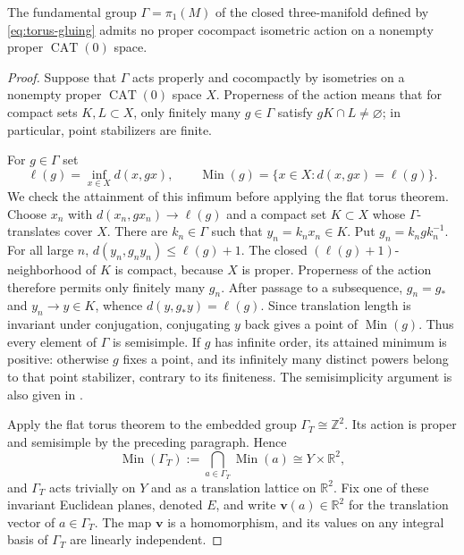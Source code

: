 \begin{theorem}\label{thm:no-cat0-action}
The fundamental group $\Gamma=\pi_1(M)$ of the closed three-manifold
defined by \eqref{eq:torus-gluing} admits no proper cocompact isometric
action on a nonempty proper $\operatorname{CAT}(0)$ space.
\end{theorem}

\begin{proof}
Suppose that $\Gamma$ acts properly and cocompactly by isometries on a
nonempty proper $\operatorname{CAT}(0)$ space $X$.  Properness of the action
means that for compact sets $K,L\subset X$, only finitely many
$g\in\Gamma$ satisfy $gK\cap L\ne\varnothing$; in particular, point
stabilizers are finite.

For $g\in\Gamma$ set
\[
 \ell(g)=\inf_{x\in X}d(x,gx),\qquad
 \operatorname{Min}(g)=\{x\in X:d(x,gx)=\ell(g)\}.
\]
We check the attainment of this infimum before applying the flat torus
theorem.  Choose $x_n$ with $d(x_n,gx_n)\to\ell(g)$ and a compact set
$K\subset X$ whose $\Gamma$-translates cover $X$.  There are $k_n\in\Gamma$
such that $y_n=k_nx_n\in K$.  Put $g_n=k_ngk_n^{-1}$.
For all large $n$, $d(y_n,g_ny_n)\le\ell(g)+1$.  The closed
$(\ell(g)+1)$-neighborhood of $K$ is compact, because $X$ is proper.
Properness of the action therefore permits only finitely many $g_n$.
After passage to a subsequence, $g_n=g_*$ and $y_n\to y\in K$, whence
$d(y,g_*y)=\ell(g)$.  Since translation length is invariant under
conjugation, conjugating $y$ back gives a point of
$\operatorname{Min}(g)$.  Thus every element of $\Gamma$ is semisimple.
If $g$ has infinite order, its attained minimum is positive: otherwise
$g$ fixes a point, and its infinitely many distinct powers belong to that
point stabilizer, contrary to its finiteness.  The semisimplicity argument
is also given in
\cite[Proposition~II.6.10(2)]{BridsonHaefliger1999}.

Apply the flat torus theorem
\cite[Theorem~II.7.1(1)--(3)]{BridsonHaefliger1999} to the embedded group
$\Gamma_T\cong\mathbb Z^2$.  Its action is proper and semisimple by the preceding
paragraph.  Hence
\[
 \operatorname{Min}(\Gamma_T):=\bigcap_{a\in\Gamma_T}\operatorname{Min}(a)
       \cong Y\times\mathbb R^2,
\]
and $\Gamma_T$ acts trivially on $Y$ and as a translation lattice on
$\mathbb R^2$.  Fix one of these invariant Euclidean planes, denoted $E$,
and write $\mathbf v(a)\in\mathbb R^2$ for the translation vector of
$a\in\Gamma_T$.  The map $\mathbf v$ is a homomorphism, and its values on any
integral basis of $\Gamma_T$ are linearly independent.


\end{proof}
